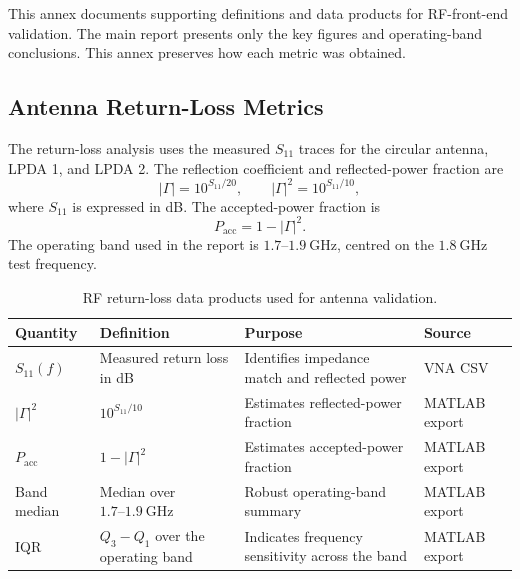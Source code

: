 \documentclass{ieeeaccess}
\begin{document}
This annex documents supporting definitions and data products for RF-front-end validation. The main report presents only the key figures and operating-band conclusions. This annex preserves how each metric was obtained.

\subsection{Antenna Return-Loss Metrics}
\label{annex:rf_s11_support}

The return-loss analysis uses the measured \(S_{11}\) traces for the circular antenna, LPDA 1, and LPDA 2. The reflection coefficient and reflected-power fraction are
\begin{equation}
|\Gamma|
=
10^{S_{11}/20},
\qquad
|\Gamma|^2
=
10^{S_{11}/10},
\label{eq:annex_gamma}
\end{equation}
where \(S_{11}\) is expressed in dB. The accepted-power fraction is
\begin{equation}
P_{\mathrm{acc}}
=
1-|\Gamma|^2.
\label{eq:annex_accepted_power}
\end{equation}
The operating band used in the report is \(1.7\text{--}1.9~\mathrm{GHz}\), centred on the \(1.8~\mathrm{GHz}\) test frequency.

\begin{table}[!t]
\caption{RF return-loss data products used for antenna validation.}
\label{tab:annex_s11_data_products}
\centering
\renewcommand{\arraystretch}{1.12}
\scriptsize
\begin{tabular}{p{} p{} p{} p{}}
\hline
\textbf{Quantity} & \textbf{Definition} & \textbf{Purpose} & \textbf{Source} \\
\hline
\(S_{11}(f)\) & Measured return loss in dB & Identifies impedance match and reflected power & VNA CSV \\
\(|\Gamma|^2\) & \(10^{S_{11}/10}\) & Estimates reflected-power fraction & MATLAB export \\
\(P_{\mathrm{acc}}\) & \(1-|\Gamma|^2\) & Estimates accepted-power fraction & MATLAB export \\
Band median & Median over \(1.7\text{--}1.9~\mathrm{GHz}\) & Robust operating-band summary & MATLAB export \\
IQR & \(Q_3-Q_1\) over the operating band & Indicates frequency sensitivity across the band & MATLAB export \\
\hline
\end{tabular}
\end{table}
\end{document}

